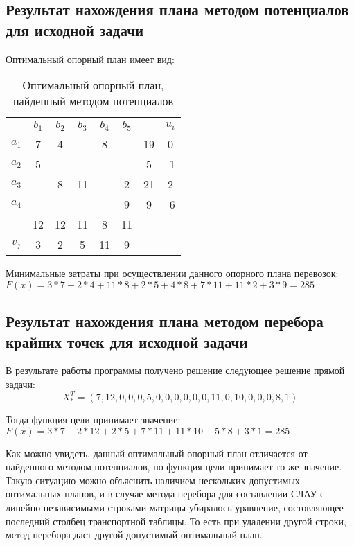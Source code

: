 \documentclass[../body.tex]{subfiles}
\begin{document}
\subsection{Результат нахождения плана методом потенциалов для исходной задачи}
Оптимальный опорный план имеет вид:
\begin{table}[h]
    \centering
    \begin{tabular}{|c|c|c|c|c|c||c||c|}
        \hline
        & $b_1$ & $b_2$ & $b_3$ & $b_4$ & $b_5$ & & $u_i$ \\\hline
        $a_1$ & 7 & 4 & - & 8 & - & 19 & 0\\\hline
        $a_2$ & 5 & - & - & - & - & 5 & -1\\\hline
        $a_3$ & - & 8 & 11 & - & 2 & 21 & 2\\\hline
        $a_4$ & - & - & - & - & 9 & 9 & -6\\\hline
        & 12 & 12 & 11 & 8 & 11 & &\\\hline
        \hline
        $v_j$ & 3 & 2 & 5 & 11 & 9 & &\\\hline
    \end{tabular}
    \caption{Оптимальный опорный план, найденный методом потенциалов}
    \label{tab:potentials}
\end{table}

Минимальные затраты при осуществлении данного опорного плана перевозок: $F(x)=3*7+2*4+11*8+2*5+4*8+7*11+11*2+3*9=285$

\subsection{Результат нахождения плана методом перебора крайних точек для исходной задачи}
В результате работы программы получено решение следующее решение прямой задачи:
\begin{equation}
    X_*^T=(7,12,0,0,0,5,0,0,0,0,0,0,11,0,10,0,0,0,8,1)
\end{equation}

Тогда функция цели принимает значение:$F(x)=3*7+2*12+2*5+7*11+11*10+5*8+3*1=285$

Как можно увидеть, данный оптимальный опорный план отличается от найденного методом потенциалов, но функция цели принимает то же значение. Такую ситуацию можно объяснить наличием нескольких допустимых оптимальных планов, и в случае метода перебора для составлении СЛАУ с линейно независимыми строками матрицы убиралось уравнение, состовляющее последний столбец транспортной таблицы. То есть при удалении другой строки, метод перебора даст другой допустимый оптимальный план.
\end{document}
